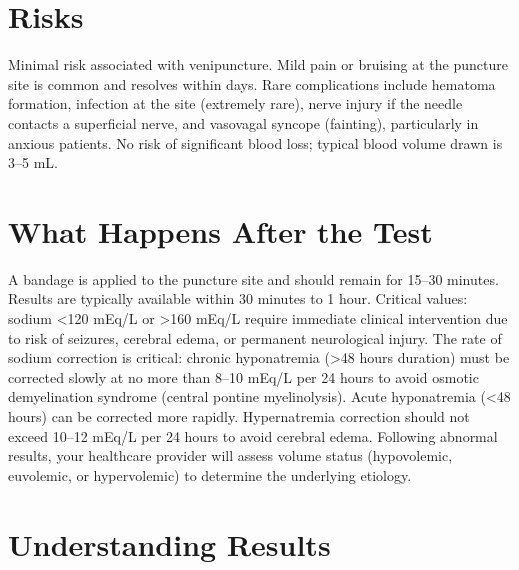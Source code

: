 \section*{Risks}
Minimal risk associated with venipuncture. Mild pain or bruising at the puncture site is common and resolves within days. Rare complications include hematoma formation, infection at the site (extremely rare), nerve injury if the needle contacts a superficial nerve, and vasovagal syncope (fainting), particularly in anxious patients. No risk of significant blood loss; typical blood volume drawn is 3--5 mL.

\section*{What Happens After the Test}
A bandage is applied to the puncture site and should remain for 15--30 minutes. Results are typically available within 30 minutes to 1 hour. Critical values: sodium <120 mEq/L or >160 mEq/L require immediate clinical intervention due to risk of seizures, cerebral edema, or permanent neurological injury. The rate of sodium correction is critical: chronic hyponatremia (>48 hours duration) must be corrected slowly at no more than 8--10 mEq/L per 24 hours to avoid osmotic demyelination syndrome (central pontine myelinolysis). Acute hyponatremia (<48 hours) can be corrected more rapidly. Hypernatremia correction should not exceed 10--12 mEq/L per 24 hours to avoid cerebral edema. Following abnormal results, your healthcare provider will assess volume status (hypovolemic, euvolemic, or hypervolemic) to determine the underlying etiology.

\section*{Understanding Results}

